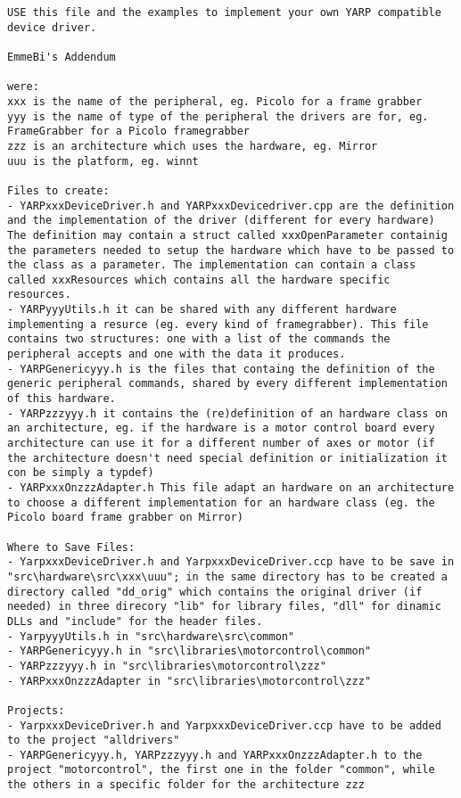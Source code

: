 \begin{verbatim}
USE this file and the examples to implement your own YARP compatible device driver.

EmmeBi's Addendum

were:
xxx is the name of the peripheral, eg. Picolo for a frame grabber
yyy is the name of type of the peripheral the drivers are for, eg. FrameGrabber for a Picolo framegrabber
zzz is an architecture which uses the hardware, eg. Mirror
uuu is the platform, eg. winnt

Files to create:
- YARPxxxDeviceDriver.h and YARPxxxDevicedriver.cpp are the definition and the implementation of the driver (different for every hardware) The definition may contain a struct called xxxOpenParameter containig the parameters needed to setup the hardware which have to be passed to the class as a parameter. The implementation can contain a class called xxxResources which contains all the hardware specific resources.
- YARPyyyUtils.h it can be shared with any different hardware implementing a resurce (eg. every kind of framegrabber). This file contains two structures: one with a list of the commands the peripheral accepts and one with the data it produces.
- YARPGenericyyy.h is the files that containg the definition of the generic peripheral commands, shared by every different implementation of this hardware.
- YARPzzzyyy.h it contains the (re)definition of an hardware class on an architecture, eg. if the hardware is a motor control board every architecture can use it for a different number of axes or motor (if the architecture doesn't need special definition or initialization it con be simply a typdef)
- YARPxxxOnzzzAdapter.h This file adapt an hardware on an architecture to choose a different implementation for an hardware class (eg. the Picolo board frame grabber on Mirror)

Where to Save Files:
- YarpxxxDeviceDriver.h and YarpxxxDeviceDriver.ccp have to be save in "src\hardware\src\xxx\uuu"; in the same directory has to be created a directory called "dd_orig" which contains the original driver (if needed) in three direcory "lib" for library files, "dll" for dinamic DLLs and "include" for the header files.
- YarpyyyUtils.h in "src\hardware\src\common"
- YARPGenericyyy.h in "src\libraries\motorcontrol\common"
- YARPzzzyyy.h in "src\libraries\motorcontrol\zzz"
- YARPxxxOnzzzAdapter in "src\libraries\motorcontrol\zzz"

Projects:
- YarpxxxDeviceDriver.h and YarpxxxDeviceDriver.ccp have to be added to the project "alldrivers"
- YARPGenericyyy.h, YARPzzzyyy.h and YARPxxxOnzzzAdapter.h to the project "motorcontrol", the first one in the folder "common", while the others in a specific folder for the architecture zzz


\end{verbatim}
